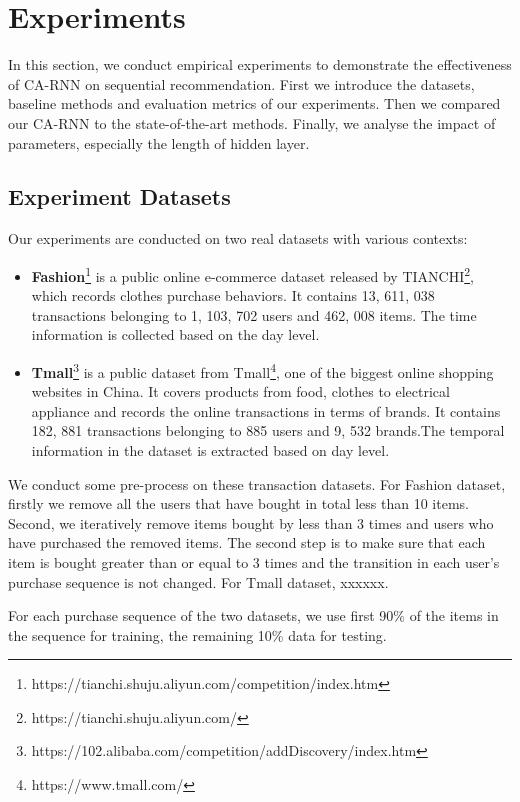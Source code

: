 \documentclass[conference]{IEEEtran}
\begin{document}
\section{Experiments}
In this section, we conduct empirical experiments to demonstrate the effectiveness of CA-RNN on sequential recommendation. First we introduce the datasets, baseline methods and evaluation metrics of our experiments. Then we compared our CA-RNN to the state-of-the-art methods. Finally, we analyse the impact of parameters, especially the length of hidden layer.
\subsection{Experiment Datasets}
Our experiments are conducted on two real datasets with various contexts:
\begin{itemize}
\item \textbf{Fashion}\footnote{https://tianchi.shuju.aliyun.com/competition/index.htm} is a public online e-commerce dataset released by TIANCHI\footnote{https://tianchi.shuju.aliyun.com/}, which records clothes purchase behaviors. It contains 13, 611, 038 transactions belonging to 1, 103, 702 users and 462, 008 items. The time information is collected based on the day level.

\item \textbf{Tmall}\footnote{https://102.alibaba.com/competition/addDiscovery/index.htm} is a public dataset from Tmall\footnote{https://www.tmall.com/}, one of the biggest online shopping websites in China. It covers products from food, clothes to electrical appliance and records the online transactions in terms of brands. It contains 182, 881 transactions belonging to 885 users and 9, 532 brands.The temporal information in the dataset is extracted based on day level.
\end{itemize}

We conduct some pre-process on these transaction datasets. For Fashion dataset, firstly we remove all the users that have bought in total less than 10 items. Second, we iteratively remove items bought by less than 3 times and users who have purchased the removed items. The second step is to make sure that each item is bought greater than or equal to 3 times and the transition in each user's purchase sequence is not changed. For Tmall dataset, xxxxxx.

For each purchase sequence of the two datasets, we use first 90\% of the items in the sequence for training, the remaining 10\% data for testing. 
\end{document}
